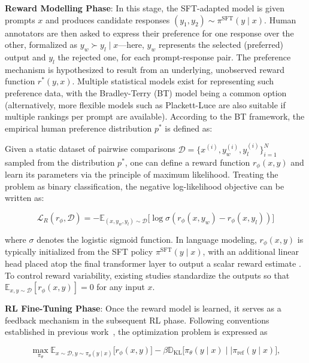 \textbf{Reward Modelling Phase}: In this stage, the SFT-adapted model is given prompts $x$ and produces candidate responses $(y_1, y_2)\sim \pi^\text{SFT}(y \mid x)$. Human annotators are then asked to express their preference for one response over the other, formalized as $y_w\succ y_l \mid x$—here, $y_w$ represents the selected (preferred) output and $y_l$ the rejected one, for each prompt-response pair. The preference mechanism is hypothesized to result from an underlying, unobserved reward function $r^*(y, x)$. Multiple statistical models exist for representing such preference data, with the Bradley-Terry (BT) model \cite{bradley1952rankanalysis} being a common option (alternatively, more flexible models such as Plackett-Luce \citep{plackett1975analysis, luce2012individual} are also suitable if multiple rankings per prompt are available). According to the BT framework, the empirical human preference distribution $p^*$ is defined as:

Given a static dataset of pairwise comparisons $\mathcal{D}=\bigl\{x^{(i)}, y_w^{(i)}, y_l^{(i)}\bigr\}_{i=1}^N$ sampled from the distribution $p^*$, one can define a reward function $r_{\phi}(x, y)$ and learn its parameters via the principle of maximum likelihood. Treating the problem as binary classification, the negative log-likelihood objective can be written as:

\begin{equation}\label{eq:reward_model}
    \mathcal{L}_R(r_{\phi}, \mathcal{D}) = -\mathbb{E}_{(x, y_w, y_l)\sim \mathcal{D}}\bigl[\log \sigma(r_{\phi}(x, y_w)- r_{\phi}(x, y_l))\bigr]
\end{equation}

where $\sigma$ denotes the logistic sigmoid function. In language modeling, $r_{\phi}(x, y)$ is typically initialized from the SFT policy $\pi^\text{SFT}(y \mid x)$, with an additional linear head placed atop the final transformer layer to output a scalar reward estimate \cite{ziegler2020finetuning}. To control reward variability, existing studies standardize the outputs so that $\mathbb{E}_{x,y\sim \mathcal{D}}\left[r_\phi(x, y)\right] = 0$ for any input $x$.

\textbf{RL Fine-Tuning Phase}: Once the reward model is learned, it serves as a feedback mechanism in the subsequent RL phase. Following conventions established in previous work~\citep{jaques2017sequence, jaques2020human}, the optimization problem is expressed as

\begin{equation}\label{eq:RL}
\max_{\pi_{\theta}}  \mathbb{E}_{x\sim \mathcal{D}, y\sim \pi_{\theta}(y \mid x)}\bigl[r_{\phi}(x, y)\bigr] - \beta\mathbb{D}_{\textrm{KL}}\bigl[\pi_{\theta}(y\mid x)\mid \mid \pi_\text{ref}(y\mid x)\bigr],
\end{equation}


